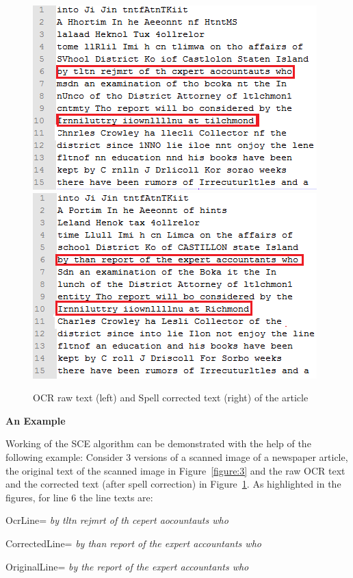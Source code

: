 \documentclass[12pt]{article}
\begin{document}
\begin{figure} [!htb]
\includegraphics[scale=0.75]{ocr3}
\includegraphics[scale=0.75]{corrected3}
\caption{OCR raw text (left) and Spell corrected text (right) of the article}
\label{figure:4}
\end{figure} 


\textbf{An Example}


Working of the SCE algorithm can be demonstrated with the help of the following example:
Consider 3 versions of a scanned image of a newspaper article,  the original text of the scanned image in Figure~\ref{figure:3} and the raw OCR text and the corrected text (after spell correction) in Figure~\ref{figure:4}. As highlighted in the figures, for line 6 the line texts are:

 OcrLine= \textit{by tltn rejmrt of th cepert aocountauts who}

CorrectedLine= \textit{by than report of the expert accountants who}

OriginalLine= \textit{by the report of the expert accountants who} 
\end{document}
